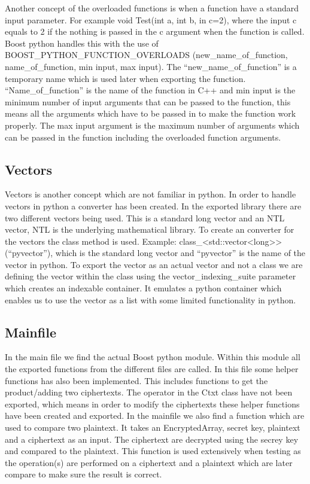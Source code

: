 Another concept of the overloaded functions is when a function have a standard input parameter. For example void Test(int a, int b, in c=2), where the input c equals to 2 if the nothing is passed in the c argument when the function is called. Boost python handles this with the use of BOOST\_PYTHON\_FUNCTION\_OVERLOADS (new\_name\_of\_function, name\_of\_function, min input, max input). The \newline “new\_name\_of\_function” is a temporary name which is used later when exporting the function. “Name\_of\_function” is the name of the function in C++ and min input is the minimum number of input arguments that can be passed to the function, this means all the arguments which have to be passed in to make the function work properly. The max input argument is the maximum number of arguments which can be passed in the function including the overloaded function arguments.


\subsection{Vectors}
Vectors is another concept which are not familiar in python. In order to handle vectors in python a converter has been created. In the exported library there are two different vectors being used. This is a standard long vector and an NTL vector, NTL is the underlying mathematical library. To create an converter for the vectors the class method is used. Example: class\_<std::vector<long>>(“pyvector”), which is the standard long vector and “pyvector” is the name of the vector in python. To export the vector as an actual vector and not a class we are defining the vector within the class using the vector\_indexing\_suite parameter which creates an indexable container. It emulates a python container which enables us to use the vector as a list with some limited functionality in python.

\subsection{Mainfile}

In the main file we find the actual Boost python module. Within this module all the exported functions from the different files are called. In this file some helper functions has also been implemented. This includes functions to get the product/adding two ciphertexts. The operator in the Ctxt class have not been exported, which means in order to modify the ciphertexts these helper functions have been created and exported. In the mainfile we also find a function which are used to compare two plaintext. It takes an EncryptedArray, secret key, plaintext and a ciphertext as an input. The ciphertext are decrypted using the secrey key and compared to the plaintext. This function is used extensively when testing as the operation(s) are performed on a ciphertext and a plaintext which are later compare to make sure the result is correct.

